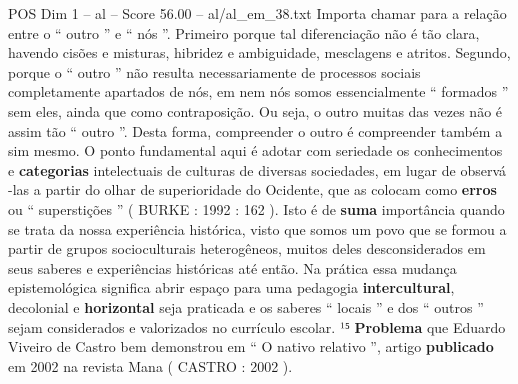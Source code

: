 \begin{textsample}{POS Dim 1 – al – Score 56.00 – al/al\_em\_38.txt}
Importa chamar para a relação entre o “ outro ” e “ nós ”.
Primeiro porque tal diferenciação não é tão clara, havendo cisões e misturas, hibridez e ambiguidade, mesclagens e atritos.
Segundo, porque o “ outro ” não resulta necessariamente de processos sociais completamente apartados de nós, em nem nós somos essencialmente “ formados ” sem eles, ainda que como contraposição.
Ou seja, o outro muitas das vezes não é assim tão “ outro ”.
Desta forma, compreender o outro é compreender também a sim mesmo.
O ponto fundamental aqui é adotar com seriedade os conhecimentos e \textbf{categorias} intelectuais de culturas de diversas sociedades, em lugar de observá -las a partir do olhar de superioridade do Ocidente, que as colocam como \textbf{erros} ou “ superstições ” ( BURKE : 1992 : 162 ).
Isto é de \textbf{suma} importância quando se trata da nossa experiência histórica, visto que somos um povo que se formou a partir de grupos socioculturais heterogêneos, muitos deles desconsiderados em seus saberes e experiências históricas até então.
Na prática essa mudança epistemológica significa abrir espaço para uma pedagogia \textbf{intercultural}, decolonial e \textbf{horizontal} seja praticada e os saberes “ locais ” e dos “ outros ” sejam considerados e valorizados no currículo escolar. ¹⁵ \textbf{Problema} que Eduardo Viveiro de Castro bem demonstrou em “ O nativo relativo ”, artigo \textbf{publicado} em 2002 na revista Mana ( CASTRO : 2002 ).

\end{textsample}
